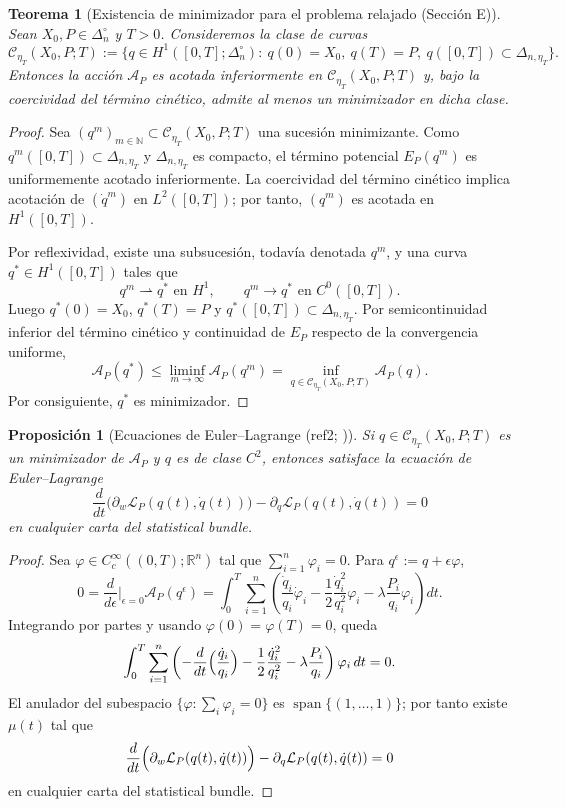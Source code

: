 ﻿\documentclass[12pt]{article}
\newcommand{\fuente}[1]{\textnormal{(#1)}}
\newcommand{\fuentecite}[2]{\textnormal{(#1; \citealp{#2})}}
\newtheorem{proposicion}{Proposición}[section]
\newtheorem{teorema}{Teorema}[section]
\begin{document}
\begin{teorema}[Existencia de minimizador para el problema relajado \fuente{Sección E}]
Sean \(X_0,P\in\Delta_n^\circ\) y \(T>0\). Consideremos la clase de curvas
\[
\mathcal C_{\eta_T}(X_0,P;T)
:=
\bigl\{q\in H^1([0,T];\Delta_n^\circ):\ q(0)=X_0,\ q(T)=P,\ q([0,T])\subset \Delta_{n,\eta_T}\bigr\}.
\]
Entonces la acción \(\mathcal A_P\) es acotada inferiormente en \(\mathcal C_{\eta_T}(X_0,P;T)\) y, bajo la coercividad del término cinético, admite al menos un minimizador en dicha clase.
\end{teorema}
\begin{proof}
Sea \((q^m)_{m\in\mathbb N}\subset \mathcal C_{\eta_T}(X_0,P;T)\) una sucesión minimizante. Como \(q^m([0,T])\subset\Delta_{n,\eta_T}\) y \(\Delta_{n,\eta_T}\) es compacto, el término potencial \(E_P(q^m)\) es uniformemente acotado inferiormente. La coercividad del término cinético implica acotación de \((\dot q^m)\) en \(L^2([0,T])\); por tanto, \((q^m)\) es acotada en \(H^1([0,T])\).

Por reflexividad, existe una subsucesión, todavía denotada \(q^m\), y una curva \(q^*\in H^1([0,T])\) tales que
\[
q^m\rightharpoonup q^* \text{ en } H^1,
\qquad
q^m\to q^* \text{ en } C^0([0,T]).
\]
Luego \(q^*(0)=X_0\), \(q^*(T)=P\) y \(q^*([0,T])\subset\Delta_{n,\eta_T}\). Por semicontinuidad inferior del término cinético y continuidad de \(E_P\) respecto de la convergencia uniforme,
\[
\mathcal A_P(q^*)\le \liminf_{m\to\infty}\mathcal A_P(q^m)=\inf_{q\in\mathcal C_{\eta_T}(X_0,P;T)}\mathcal A_P(q).
\]
Por consiguiente, \(q^*\) es minimizador.
\end{proof}

\begin{proposicion}[Ecuaciones de Euler--Lagrange \fuentecite{ref2}{Pistone2018Lagrangian}]
Si \(q\in \mathcal C_{\eta_T}(X_0,P;T)\) es un minimizador de \(\mathcal A_P\) y \(q\) es de clase \(C^2\), entonces satisface la ecuación de Euler--Lagrange
\[
\frac{d}{dt}\bigl(\partial_w \mathcal L_P(q(t),\dot q(t))\bigr)
-\partial_q \mathcal L_P(q(t),\dot q(t))=0
\]
en cualquier carta del statistical bundle.
\end{proposicion}
\begin{proof}
Sea \(\varphi\in C_c^\infty((0,T);\mathbb R^n)\) tal que \(\sum_{i=1}^n \varphi_i=0\). Para \(q^\epsilon:=q+\epsilon\varphi\),
\[
0=\frac{d}{d\epsilon}\Big|_{\epsilon=0}\mathcal A_P(q^\epsilon)
=\int_0^T \sum_{i=1}^n\left(
\frac{\dot q_i}{q_i}\dot\varphi_i
-\frac12\frac{\dot q_i^2}{q_i^2}\varphi_i
-\lambda\frac{P_i}{q_i}\varphi_i
\right)dt.
\]
Integrando por partes y usando \(\varphi(0)=\varphi(T)=0\), queda
\[
\int_0^T \sum_{i=1}^n \left(
-\frac{d}{dt}\Bigl(\frac{\dot q_i}{q_i}\Bigr)
-\frac12\frac{\dot q_i^2}{q_i^2}
-\lambda\frac{P_i}{q_i}
\right)\varphi_i\,dt=0.
\]
El anulador del subespacio \(\{\varphi:\sum_i\varphi_i=0\}\) es \(\operatorname{span}\{(1,\dots,1)\}\); por tanto existe \(\mu(t)\) tal que
\[
\frac{d}{dt}\Bigl(\partial_w\mathcal L_P(q(t),\dot q(t))\Bigr)-\partial_q\mathcal L_P(q(t),\dot q(t))=0
\]
en cualquier carta del statistical bundle.
\end{proof}
\end{document}
